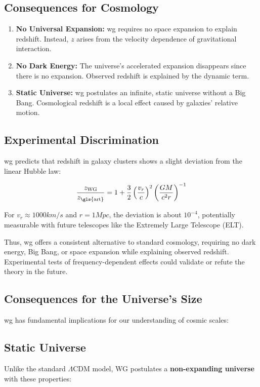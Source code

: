 \subsection{Consequences for Cosmology}
\begin{enumerate}
    \item \textbf{No Universal Expansion:} \gls{wg} requires no space expansion to explain redshift. Instead, $z$ arises from the velocity dependence of gravitational interaction.
    \item \textbf{No Dark Energy:} The universe's accelerated expansion disappears since there is no expansion. Observed redshift is explained by the dynamic term.
    \item \textbf{Static Universe:} \gls{wg} postulates an infinite, static universe without a Big Bang. Cosmological redshift is a local effect caused by galaxies' relative motion.
\end{enumerate}

\subsection{Experimental Discrimination}
\gls{wg} predicts that redshift in galaxy clusters shows a slight deviation from the linear Hubble law:

\begin{equation}
    \frac{z_{\text{WG}}}{z_{\text{\gls{art}}}} = 1 + \frac{3}{2} \left( \frac{v_r}{c} \right)^2 \left( \frac{GM}{c^2 r} \right)^{-1}
\end{equation}

For $v_r \approx 1000 km/s$ and $r = 1 Mpc$, the deviation is about $10^{-4}$, potentially measurable with future telescopes like the Extremely Large Telescope (ELT).

Thus, \gls{wg} offers a consistent alternative to standard cosmology, requiring no dark energy, Big Bang, or space expansion while explaining observed redshift.
Experimental tests of frequency-dependent effects could validate or refute the theory in the future.

\subsection{Consequences for the Universe's Size}
\gls{wg} has fundamental implications for our understanding of cosmic scales:

\subsection{Static Universe}
Unlike the standard $\Lambda$CDM model, WG postulates a \textbf{non-expanding universe} with these properties:


